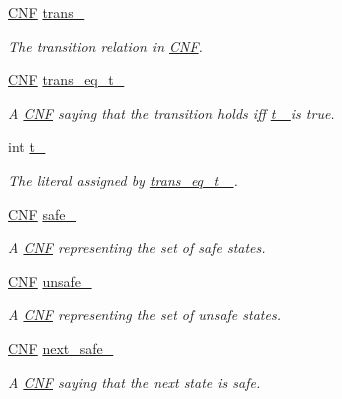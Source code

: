 \begin{DoxyCompactItemize}
\item 
\hyperlink{classCNF}{C\-N\-F} \hyperlink{classAIG2CNF_aedcb9a8efe69fe03721fdc17c5d11bfc}{trans\-\_\-}
\begin{DoxyCompactList}\small\item\em The transition relation in \hyperlink{classCNF}{C\-N\-F}. \end{DoxyCompactList}\item 
\hyperlink{classCNF}{C\-N\-F} \hyperlink{classAIG2CNF_af7e9b65092f626865a4aa541a48e4f1b}{trans\-\_\-eq\-\_\-t\-\_\-}
\begin{DoxyCompactList}\small\item\em A \hyperlink{classCNF}{C\-N\-F} saying that the transition holds iff \hyperlink{classAIG2CNF_af2a7f6ecdcec3b5b2f37a11b0adde65a}{t\-\_\- } is true. \end{DoxyCompactList}\item 
int \hyperlink{classAIG2CNF_af2a7f6ecdcec3b5b2f37a11b0adde65a}{t\-\_\-}
\begin{DoxyCompactList}\small\item\em The literal assigned by \hyperlink{classAIG2CNF_af7e9b65092f626865a4aa541a48e4f1b}{trans\-\_\-eq\-\_\-t\-\_\- }. \end{DoxyCompactList}\item 
\hyperlink{classCNF}{C\-N\-F} \hyperlink{classAIG2CNF_a394d2a3600bc3bec864cf08acac61437}{safe\-\_\-}
\begin{DoxyCompactList}\small\item\em A \hyperlink{classCNF}{C\-N\-F} representing the set of safe states. \end{DoxyCompactList}\item 
\hyperlink{classCNF}{C\-N\-F} \hyperlink{classAIG2CNF_afbfcf3a27261a2283a99362d2527d64f}{unsafe\-\_\-}
\begin{DoxyCompactList}\small\item\em A \hyperlink{classCNF}{C\-N\-F} representing the set of unsafe states. \end{DoxyCompactList}\item 
\hyperlink{classCNF}{C\-N\-F} \hyperlink{classAIG2CNF_a057c6a3159253267c99f115b7d724ee2}{next\-\_\-safe\-\_\-}
\begin{DoxyCompactList}\small\item\em A \hyperlink{classCNF}{C\-N\-F} saying that the next state is safe. \end{DoxyCompactList}\item 

\end{DoxyCompactItemize}
